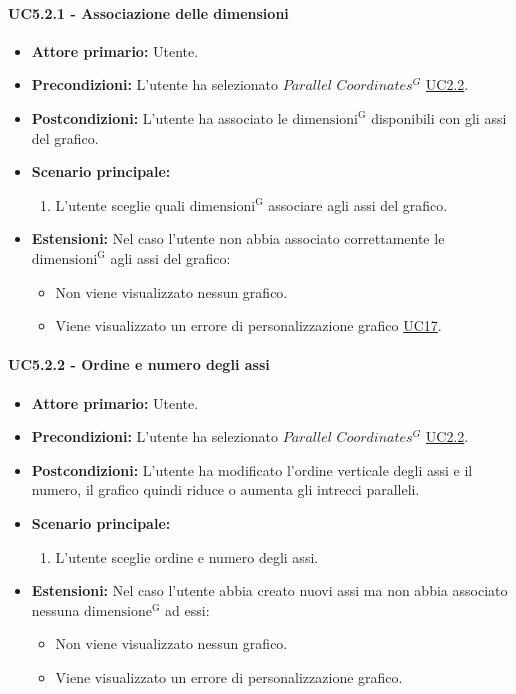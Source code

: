 \paragraph{UC5.2.1 - Associazione delle dimensioni}
\label{sec:UC5.2.1}
    \begin{itemize}
        \item \textbf{Attore primario:} Utente.
        \item \textbf{Precondizioni:} L'utente ha selezionato $Parallel$ $Coordinates^{G}$ \hyperref[sec:UC2.2]{UC2.2}.
	    \item \textbf{Postcondizioni:} L'utente ha associato le ${\mathrm{dimensioni^{G}}}$ disponibili con gli assi del grafico.
	    \item \textbf{Scenario principale:}
	    \begin{enumerate}
	    		\item L'utente sceglie quali ${\mathrm{dimensioni^{G}}}$ associare agli assi del grafico.
		\end{enumerate}
	    \item \textbf{Estensioni:} Nel caso l'utente non abbia associato correttamente le ${\mathrm{dimensioni^{G}}}$ agli assi del grafico:
              \begin{itemize}
                  \item Non viene visualizzato nessun grafico.
                  \item Viene visualizzato un errore di personalizzazione grafico \hyperref[sec:UC17 - Errore di personalizzazione]{UC17}.
              \end{itemize}
    \end{itemize}
\paragraph{UC5.2.2 - Ordine e numero degli assi}
\label{sec:UC5.2.2}
    \begin{itemize}
        \item \textbf{Attore primario:} Utente.
        \item \textbf{Precondizioni:} L'utente ha selezionato $Parallel$ $Coordinates^{G}$ \hyperref[sec:UC2.2]{UC2.2}.
	    \item \textbf{Postcondizioni:} L'utente ha modificato l'ordine verticale degli assi e il numero, il grafico quindi riduce o aumenta gli intrecci paralleli.
	    \item \textbf{Scenario principale:} 
	    \begin{enumerate}
	    		\item L'utente sceglie ordine e numero degli assi.
		\end{enumerate}
	    \item \textbf{Estensioni:} Nel caso l'utente abbia creato nuovi assi ma non abbia associato nessuna ${\mathrm{dimensione^{G}}}$ ad essi:
              \begin{itemize}
                  \item Non viene visualizzato nessun grafico.
                  \item Viene visualizzato un errore di personalizzazione grafico.
              \end{itemize}
    \end{itemize}
    
